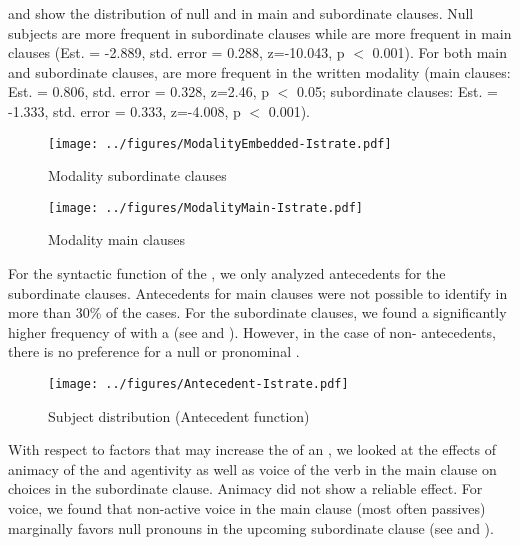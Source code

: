 \documentclass[output=paper,colorlinks,citecolor=brown]{langscibook}
\begin{document}
 and  show the distribution of null and  in main and subordinate clauses. Null subjects are more frequent in subordinate clauses while  are more frequent in main clauses (Est. = -2.889, std. error = 0.288, z=-10.043, p $<$ 0.001). For both main and subordinate clauses,  are more frequent in the written modality (main clauses: Est. = 0.806, std. error = 0.328, z=2.46, p $<$ 0.05; subordinate clauses: Est. = -1.333, std. error = 0.333, z=-4.008, p $<$ 0.001).


\begin{figure}[h]
\centering
\texttt{[image: ../figures/ModalityEmbedded-Istrate.pdf]}
\caption{Modality subordinate clauses}
\label{ModSub:Istrate}
\end{figure}

\begin{figure}[h]
\centering
\texttt{[image: ../figures/ModalityMain-Istrate.pdf]}
\caption{Modality main clauses}
\label{ModMain:Istrate}
\end{figure}

For the syntactic function of the , we only analyzed antecedents for the subordinate clauses. Antecedents for main clauses were not possible to identify in more than 30\% of the cases. For the subordinate clauses, we found a significantly higher  frequency of  with a   (see  and ). However, in the case of non- antecedents, there is no preference for a null or pronominal .

\begin{figure}[h]
\centering
\texttt{[image: ../figures/Antecedent-Istrate.pdf]}
\caption{Subject distribution (Antecedent function)}
\label{CorpusAnt:Istrate}
\end{figure}


With respect to factors that may increase the  of an , we looked at the effects of animacy of the  and agentivity as well as voice of the verb in the main clause on  choices in the subordinate clause. Animacy did not show a reliable effect. For voice, we found that non-active voice in the main clause (most often passives) marginally favors null  pronouns in the upcoming subordinate clause (see  and ).
\end{document}

